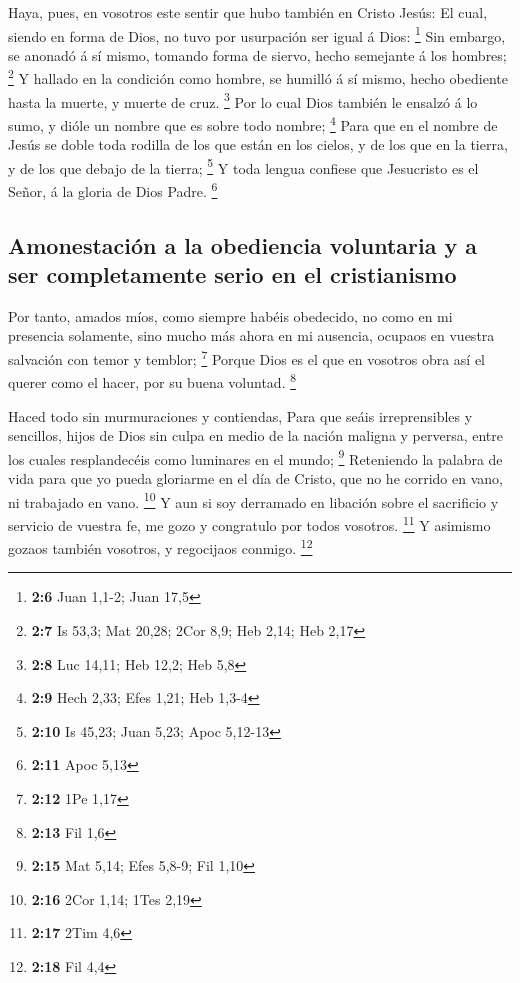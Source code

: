  Haya, pues, en vosotros este sentir que hubo también en
Cristo Jesús:  El cual, siendo en forma de Dios, no tuvo por
usurpación ser igual á Dios: \footnote{\textbf{2:6} Juan 1,1-2; Juan
  17,5}  Sin embargo, se anonadó á sí mismo, tomando forma
de siervo, hecho semejante á los hombres; \footnote{\textbf{2:7} Is
  53,3; Mat 20,28; 2Cor 8,9; Heb 2,14; Heb 2,17}  Y hallado
en la condición como hombre, se humilló á sí mismo, hecho obediente
hasta la muerte, y muerte de cruz. \footnote{\textbf{2:8} Luc 14,11; Heb
  12,2; Heb 5,8}  Por lo cual Dios también le ensalzó á lo
sumo, y dióle un nombre que es sobre todo nombre; \footnote{\textbf{2:9}
  Hech 2,33; Efes 1,21; Heb 1,3-4}  Para que en el nombre
de Jesús se doble toda rodilla de los que están en los cielos, y de los
que en la tierra, y de los que debajo de la tierra; \footnote{\textbf{2:10}
  Is 45,23; Juan 5,23; Apoc 5,12-13}  Y toda lengua
confiese que Jesucristo es el Señor, á la gloria de Dios Padre.
\footnote{\textbf{2:11} Apoc 5,13}

\hypertarget{amonestaciuxf3n-a-la-obediencia-voluntaria-y-a-ser-completamente-serio-en-el-cristianismo}{%
\subsection{Amonestación a la obediencia voluntaria y a ser
completamente serio en el
cristianismo}\label{amonestaciuxf3n-a-la-obediencia-voluntaria-y-a-ser-completamente-serio-en-el-cristianismo}}

 Por tanto, amados míos, como siempre habéis obedecido, no
como en mi presencia solamente, sino mucho más ahora en mi ausencia,
ocupaos en vuestra salvación con temor y temblor; \footnote{\textbf{2:12}
  1Pe 1,17}  Porque Dios es el que en vosotros obra así el
querer como el hacer, por su buena voluntad. \footnote{\textbf{2:13} Fil
  1,6}

 Haced todo sin murmuraciones y contiendas, 
Para que seáis irreprensibles y sencillos, hijos de Dios sin culpa en
medio de la nación maligna y perversa, entre los cuales resplandecéis
como luminares en el mundo; \footnote{\textbf{2:15} Mat 5,14; Efes
  5,8-9; Fil 1,10}  Reteniendo la palabra de vida para que
yo pueda gloriarme en el día de Cristo, que no he corrido en vano, ni
trabajado en vano. \footnote{\textbf{2:16} 2Cor 1,14; 1Tes 2,19}
 Y aun si soy derramado en libación sobre el sacrificio y
servicio de vuestra fe, me gozo y congratulo por todos vosotros.
\footnote{\textbf{2:17} 2Tim 4,6}  Y asimismo gozaos
también vosotros, y regocijaos conmigo. \footnote{\textbf{2:18} Fil 4,4}

